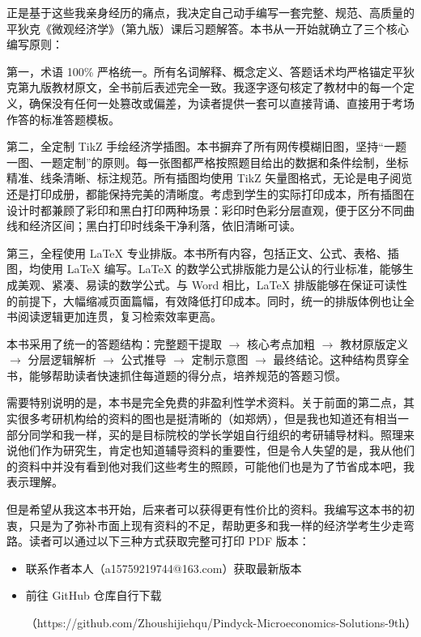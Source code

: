 \documentclass[a4paper, 10pt, openany]{ctexbook}
\begin{document}
	正是基于这些我亲身经历的痛点，我决定自己动手编写一套完整、规范、高质量的平狄克《微观经济学》（第九版）课后习题解答。本书从一开始就确立了三个核心编写原则：
	
	第一，术语 100\% 严格统一。所有名词解释、概念定义、答题话术均严格锚定平狄克第九版教材原文，全书前后表述完全一致。我逐字逐句核定了教材中的每一个定义，确保没有任何一处篡改或偏差，为读者提供一套可以直接背诵、直接用于考场作答的标准答题模板。
	
	第二，全定制 TikZ 手绘经济学插图。本书摒弃了所有网传模糊旧图，坚持“一题一图、一题定制”的原则。每一张图都严格按照题目给出的数据和条件绘制，坐标精准、线条清晰、标注规范。所有插图均使用 TikZ 矢量图格式，无论是电子阅览还是打印成册，都能保持完美的清晰度。考虑到学生的实际打印成本，所有插图在设计时都兼顾了彩印和黑白打印两种场景：彩印时色彩分层直观，便于区分不同曲线和经济区间；黑白打印时线条干净利落，依旧清晰可读。
	
	第三，全程使用 LaTeX 专业排版。本书所有内容，包括正文、公式、表格、插图，均使用 LaTeX 编写。LaTeX 的数学公式排版能力是公认的行业标准，能够生成美观、紧凑、易读的数学公式。与 Word 相比，LaTeX 排版能够在保证可读性的前提下，大幅缩减页面篇幅，有效降低打印成本。同时，统一的排版体例也让全书阅读逻辑更加连贯，复习检索效率更高。
	
	本书采用了统一的答题结构：完整题干提取 $\rightarrow$ 核心考点加粗 $\rightarrow$ 教材原版定义 $\rightarrow$ 分层逻辑解析 $\rightarrow$ 公式推导 $\rightarrow$ 定制示意图 $\rightarrow$ 最终结论。这种结构贯穿全书，能够帮助读者快速抓住每道题的得分点，培养规范的答题习惯。
	
	需要特别说明的是，本书是完全免费的非盈利性学术资料。关于前面的第二点，其实很多考研机构给的资料的图也是挺清晰的（如郑炳），但是我也知道还有相当一部分同学和我一样，买的是目标院校的学长学姐自行组织的考研辅导材料。照理来说他们作为研究生，肯定也知道辅导资料的重要性，但是令人失望的是，我从他们的资料中并没有看到他对我们这些考生的照顾，可能他们也是为了节省成本吧，我表示理解。
	
	但是希望从我这本书开始，后来者可以获得更有性价比的资料。我编写这本书的初衷，只是为了弥补市面上现有资料的不足，帮助更多和我一样的经济学考生少走弯路。读者可以通过以下三种方式获取完整可打印 PDF 版本：
	\begin{itemize}[itemsep=0.5ex, parsep=0.5ex]
		\item 联系作者本人（a15759219744@163.com）获取最新版本
		\item 前往 GitHub 仓库自行下载
		
		（https://github.com/Zhoushijiehqu/Pindyck-Microeconomics-Solutions-9th）
	\end{itemize}
	
\end{document}
